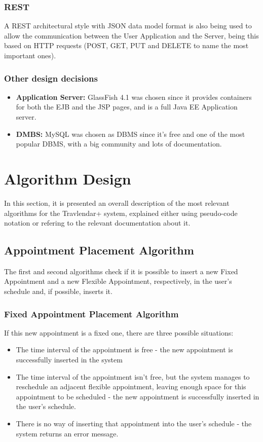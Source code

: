 \documentclass[12pt]{article}
\begin{document}
\subsubsection{REST} A REST architectural style with JSON data model format is also being used to allow the communication between the User Application and the Server, being this based on HTTP requests (POST, GET, PUT and DELETE to name the most important ones).

\subsubsection{Other design decisions}
\begin{itemize}
    \item \textbf{Application Server:} GlassFish 4.1 was chosen since it provides containers for both the EJB and the JSP pages, and is a full Java EE Application server.
    \item \textbf{DMBS:} MySQL was chosen as DBMS since it's free and one of the most popular DBMS, with a big community and lots of documentation.
\end{itemize}

\section{Algorithm Design}
In this section, it is presented an overall description of the most relevant algorithms for the Travlendar+ system, explained either using pseudo-code notation or refering to the relevant documentation about it.


\subsection{Appointment Placement Algorithm}
The first and second algorithms check if it is possible to insert a new Fixed Appointment and a new Flexible Appointment, respectively, in the user's schedule and, if possible, inserts it.

\subsubsection{Fixed Appointment Placement Algorithm}

If this new appointment is a fixed one, there are three possible situations:
\begin{itemize}
    \item The time interval of the appointment is free - the new appointment is successfully inserted in the system
    \item The time interval of the appointment isn't free, but the system manages to reschedule an adjacent flexible appointment, leaving enough space for this appointment to be scheduled - the new appointment is successfully inserted in the user's schedule.
    \item There is no way of inserting that appointment into the user's schedule - the system returns an error message.
\end{itemize}
\end{document}
